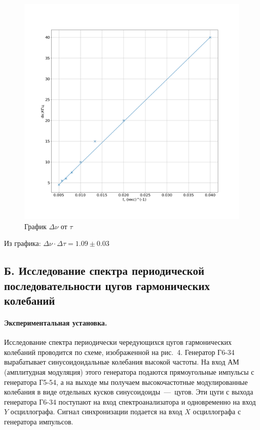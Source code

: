 \documentclass[a4paper, 12pt]{article}
\newcommand{\mysec}[1]{\begin{center}\section*{#1}\end{center}}
\begin{document}
\begin{enumerate}
        \begin{figure}[!h]
            \includegraphics[scale=0.4]{graph1.png}
            \caption{График $\Delta \nu$ от $\tau$}
        \end{figure}

        Из графика: $\Delta \nu \cdot \Delta \tau = 1.09 \pm 0.03$
    \end{enumerate}

    \mysec{Б. Исследование спектра периодической последовательности цугов гармонических колебаний}

    \paragraph*{Экспериментальная установка.} Исследование спектра периодически чередующихся цугов гармонических колебаний проводится по схеме, изображенной на рис.~4. Генератор Г6-34 вырабатывает синусоидоидальные колебания высокой частоты. На вход АМ (амплитудная модуляция) этого генератора подаются прямоугольные импульсы с генератора Г5-54, а на выходе мы получаем высокочастотные модулированные колебания в виде отдельных кусков синусоидоиды~---~цугов. Эти цуги с выхода генератора Г6-34 поступают на вход спектроанализатора и одновременно на вход $Y$ осциллографа. Сигнал синхронизации подается на вход $X$ осциллографа с генератора импульсов.
\end{document}
